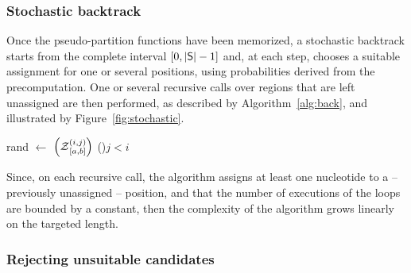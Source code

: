 \subsubsection{\GCContent Stochastic backtrack}
Once the pseudo-partition functions have been memorized, a stochastic backtrack starts from the complete interval $[0,|\text{\sf S}|-1]$ and, at each step, chooses a suitable assignment for one or several positions, using probabilities derived from the precomputation. One or several recursive calls over regions that are left unassigned are then performed, as described by Algorithm~\ref{alg:back}, and illustrated by Figure~\ref{fig:stochastic}.
\begin{algorithm}[t]
\DontPrintSemicolon
	\SetAlgoLined
{}
	rand $\leftarrow$ \Random$\left(\Z{i,j}{a,b}\right)$\tcp*[r]{Draw random number in $[0,\Z{i,j}{a,b}[$}
 \lIf(){$j<i$}{\Return{$\varepsilon$}}
\caption{\protect\Backtrack$\left(i,j,a,b,\Target\right)$\label{alg:back}}
\end{algorithm}

Since, on each recursive call, the algorithm assigns at least one nucleotide to a -- previously unassigned -- position, and that the number of executions of the loops are bounded by a constant, then the complexity of the algorithm grows linearly on the targeted length. 


\subsubsection{Rejecting unsuitable candidates}

